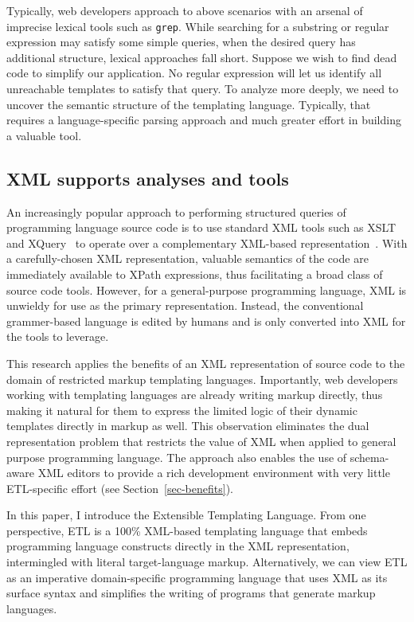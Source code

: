 \documentclass{www2003-submission}
\newcommand{\smtexttt}[1]{{\small\texttt{#1}}}
\newcommand{\secref}[1]{Section~\ref{sec-#1}}
\begin{document}
Typically, web developers approach to above scenarios with an arsenal
of imprecise lexical tools such as \smtexttt{grep}.  While searching
for a substring or regular expression may satisfy some simple queries,
when the desired query has additional structure, lexical approaches
fall short.  Suppose we wish to find dead code to simplify our
application. No regular expression will let us identify all
unreachable templates to satisfy that query.  To analyze more deeply,
we need to uncover the semantic structure of the templating language.
Typically, that requires a language-specific parsing approach and much
greater effort in building a valuable tool.

\subsection{XML supports analyses and tools}

An increasingly popular approach to performing structured queries of
programming language source code is to use standard XML tools such as
XSLT~\cite{XSLT} and XQuery~\cite{XQuery} to operate over a
complementary XML-based representation~\cite{Badros-www9,others}.
With a carefully-chosen XML representation, valuable semantics of the
code are immediately available to XPath expressions, thus facilitating
a broad class of source code tools.  However, for a general-purpose
programming language, XML is unwieldy for use as the primary
representation.  Instead, the conventional grammer-based language is
edited by humans and is only converted into XML for the tools to
leverage.

This research applies the benefits of an XML representation of source
code to the domain of restricted markup templating languages.
Importantly, web developers working with templating languages are
already writing markup directly, thus making it natural for them to
express the limited logic of their dynamic templates directly in
markup as well.  This observation eliminates the dual representation
problem that restricts the value of XML when applied to general
purpose programming language.  The approach also enables the use of
schema-aware XML editors to provide a rich development environment
with very little ETL-specific effort (see \secref{benefits}).

In this paper, I introduce the Extensible Templating Language.  From
one perspective, ETL is a 100\% XML-based templating language that
embeds programming language constructs directly in the XML
representation, intermingled with literal target-language markup.
Alternatively, we can view ETL as an imperative domain-specific
programming language that uses XML as its surface syntax and
simplifies the writing of programs that generate markup languages.
\end{document}
